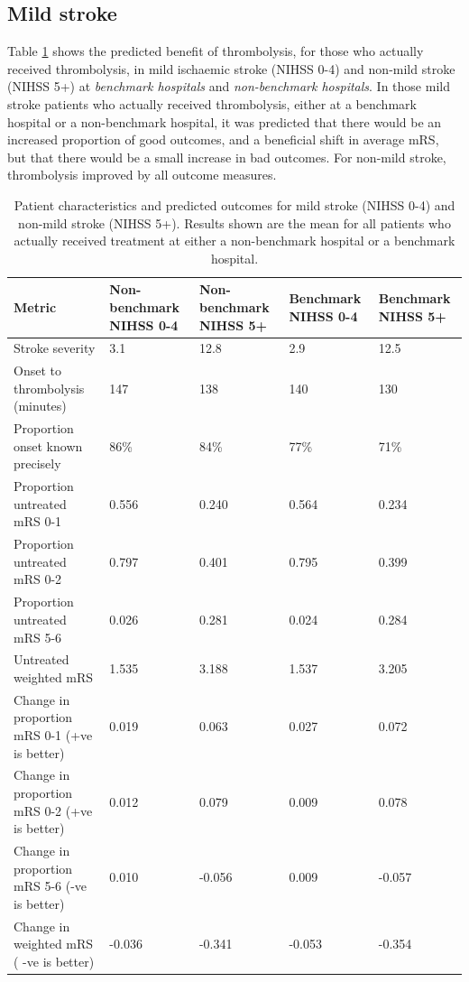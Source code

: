 \subsection{Mild stroke}

Table \ref{tab:mild_stroke} shows the predicted benefit of thrombolysis, for those who actually received thrombolysis, in mild ischaemic stroke (NIHSS 0-4) and non-mild stroke (NIHSS 5+) at \textit{benchmark hospitals} and \textit{non-benchmark hospitals}. In those mild stroke patients who actually received thrombolysis, either at a benchmark hospital or a non-benchmark hospital, it was predicted that there would be an increased proportion of good outcomes, and a beneficial shift in average mRS, but that there would be a small increase in bad outcomes. For non-mild stroke, thrombolysis improved by all outcome measures.

\begin{minipage}{1\textwidth}
\small
\renewcommand{\arraystretch}{1.2}
\begin{longtable}{p{7.2cm} | p{1.6cm} p{1.6cm} | p{1.6cm} p{1.6cm}}
\caption{Patient characteristics and predicted outcomes for mild stroke (NIHSS 0-4) and non-mild stroke (NIHSS 5+). Results shown are the mean for all patients who actually received treatment at either a non-benchmark hospital or a benchmark hospital.}\\
\label{tab:mild_stroke}

Metric & Non-benchmark NIHSS 0-4 & Non-benchmark NIHSS 5+ & Benchmark NIHSS 0-4 & Benchmark NIHSS 5+\\
\endhead
\midrule
Stroke severity & 3.1 & 12.8 & 2.9 & 12.5\\
Onset to thrombolysis (minutes) & 147 & 138 & 140 & 130\\
Proportion onset known precisely & 86\% & 84\% & 77\% & 71\%\\
Proportion untreated mRS 0-1 & 0.556 & 0.240 & 0.564 & 0.234\\
Proportion untreated mRS 0-2 & 0.797 & 0.401 & 0.795 & 0.399\\
Proportion untreated mRS 5-6 & 0.026 & 0.281 & 0.024 & 0.284\\
Untreated weighted mRS & 1.535 & 3.188 & 1.537 & 3.205\\
Change in proportion mRS 0-1 (+ve is better) & 0.019 & 0.063 & 0.027 & 0.072\\
Change in proportion mRS 0-2 (+ve is better) & 0.012 & 0.079 & 0.009 & 0.078\\
Change in proportion mRS 5-6 (-ve is better) & 0.010 & -0.056 & 0.009 & -0.057\\
Change in weighted mRS ( -ve is better) & -0.036 & -0.341 & -0.053 & -0.354\\

\end{longtable}
\normalsize
\end{minipage}


